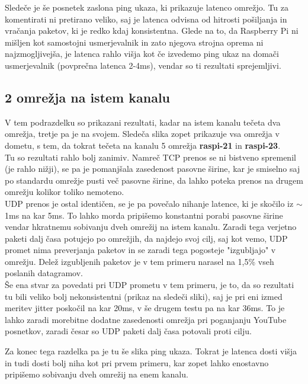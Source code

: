 \documentclass[11pt,a4paper,slovene]{article}
\begin{document}
Sledeče je še posnetek zaslona ping ukaza, ki prikazuje latenco omrežjo. Tu za komentirati ni pretirano veliko, saj je latenca odvisna od hitrosti pošiljanja in vračanja paketov, ki je redko kdaj konsistentna. Glede na to, da Raspberry Pi ni mišljen kot samostojni usmerjevalnik in zato njegova strojna oprema ni najzmogljivejša, je latenca rahlo višja kot če izvedemo ping ukaz na domači usmerjevalnik (povprečna latenca 2-4ms), vendar so ti rezultati sprejemljivi.\\

\subsection{2 omrežja na istem kanalu}
V tem podrazdelku so prikazani rezultati, kadar na istem kanalu tečeta dva omrežja, tretje pa je na svojem. Sledeča slika zopet prikazuje vsa omrežja v dometu, s tem, da tokrat tečeta na kanalu 5 omrežja \textbf{raspi-21} in \textbf{raspi-23}.\\

Tu so rezultati rahlo bolj zanimiv. Namreč TCP prenos se ni bistveno spremenil (je rahlo nižji), se pa je pomanjšala zasedenost pasovne širine, kar je smiselno saj po standardu omrežje pusti več pasovne širine, da lahko poteka prenos na drugem omrežju kolikor toliko nemoteno.\\

UDP prenos je ostal identičen, se je pa povečalo nihanje latence, ki je skočilo iz $\sim$1ms na kar 5ms. To lahko morda pripišemo konstantni porabi pasovne širine vendar hkratnemu sobivanju dveh omrežij na istem kanalu. Zaradi tega verjetno paketi dalj časa potujejo po omrežjih, da najdejo svoj cilj, saj kot vemo, UDP promet nima preverjanja paketov in se zaradi tega pogosteje "izgubljajo" v omrežju. Delež izgubljenih paketov je v tem primeru narasel na 1,5\% vseh poslanih datagramov.\\

Še ena stvar za povedati pri UDP prometu v tem primeru, je to, da so rezultati tu bili veliko bolj nekonsistentni (prikaz na sledeči sliki), saj je pri eni izmed meritev jitter poskočil na kar 20ms, v še drugem testu pa na kar 36ms. To je lahko zaradi morebitne dodatne zasedenosti omrežja pri poganjanju YouTube posnetkov, zaradi česar so UDP paketi dalj časa potovali proti cilju.

Za konec tega razdelka pa je tu še slika ping ukaza. Tokrat je latenca dosti višja in tudi dosti bolj niha kot pri prvem primeru, kar zopet lahko enostavno pripišemo sobivanju dveh omrežij na enem kanalu.
\end{document}
